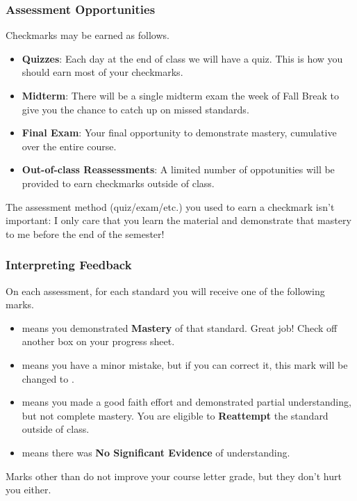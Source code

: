 \begin{frame}\frametitle{Assessment Opportunities}
Checkmarks may be earned as follows.
\begin{itemize}
\item {\bf Quizzes}: Each day at the end of class we will have a quiz. This
      is how you should earn most of your checkmarks.
\item {\bf Midterm}: There will be a single midterm exam the week of Fall Break
      to give you the chance to catch up on missed standards.
\item {\bf Final Exam}: Your final opportunity to demonstrate mastery,
      cumulative over the entire course.
\item {\bf Out-of-class Reassessments}: A limited number of oppotunities
      will be provided to earn checkmarks outside of class.
\end{itemize}

\pause

\vspace{0.2in}

The assessment method (quiz/exam/etc.) you used to earn a checkmark
isn't important: I only care that you
learn the material and demonstrate that mastery to me before the end of the
semester!
\end{frame}

\begin{frame}\frametitle{Interpreting Feedback}
On each assessment, for each standard you will receive one of the following marks.
\begin{itemize}
\item \masteryMark{} means you demonstrated \textbf{Mastery} of that standard.
      Great job!  Check off another box on your progress sheet.
\item \minorMark{} means you have a minor mistake, but if you can correct it,
      this mark will be changed to \masteryMark{}.
\item \reattemptMark{} means you made a good faith effort and demonstrated
      partial understanding, but not complete mastery. You are eligible to
      \textbf{Reattempt} the standard outside of class.
\item \noMark{} means there was \textbf{No Significant Evidence} of understanding.
\end{itemize}

\pause

\vspace{0.2in}

Marks other than \masteryMark{} do not improve your course letter grade, but
they don't hurt you either.
\end{frame}

